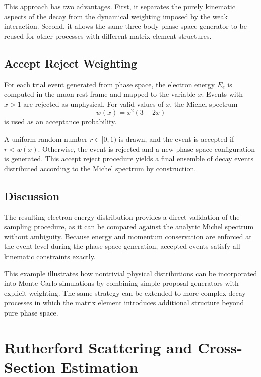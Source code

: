 \documentclass[11pt,a4paper]{article}
\begin{document}
This approach has two advantages. First, it separates the purely kinematic aspects of
the decay from the dynamical weighting imposed by the weak interaction. Second, it allows
the same three body phase space generator to be reused for other processes with different
matrix element structures.

\subsection{Accept Reject Weighting}

For each trial event generated from phase space, the electron energy $E_e$ is computed
in the muon rest frame and mapped to the variable $x$. Events with $x > 1$ are rejected
as unphysical. For valid values of $x$, the Michel spectrum
\begin{equation}
w(x) = x^2 (3 - 2x)
\end{equation}
is used as an acceptance probability.

A uniform random number $r \in [0,1)$ is drawn, and the event is accepted if $r < w(x)$.
Otherwise, the event is rejected and a new phase space configuration is generated. This
accept reject procedure yields a final ensemble of decay events distributed according to
the Michel spectrum by construction.

\subsection{Discussion}

The resulting electron energy distribution provides a direct validation of the sampling
procedure, as it can be compared against the analytic Michel spectrum without ambiguity.
Because energy and momentum conservation are enforced at the event level during the phase
space generation, accepted events satisfy all kinematic constraints exactly.

This example illustrates how nontrivial physical distributions can be incorporated into
Monte Carlo simulations by combining simple proposal generators with explicit weighting.
The same strategy can be extended to more complex decay processes in which the matrix
element introduces additional structure beyond pure phase space.


\section{Rutherford Scattering and Cross-Section Estimation}
\label{sec:rutherford}
\end{document}
